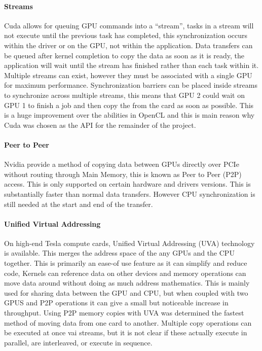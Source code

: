 \documentclass[12pt,a4paper]{article}
\begin{document}
\paragraph{Streams}
Cuda allows for queuing GPU commands into a “stream”, tasks in a stream will not execute until the previous task has completed, this synchronization occurs within the driver or on the GPU, not within the application. Data transfers can be queued after kernel completion to copy the data as soon as it is ready, the application will wait until the stream has finished rather than each task within it. Multiple streams can exist, however they must be associated with a single GPU for maximum performance. Synchronization barriers can be placed inside streams to synchronize across multiple streams, this means that GPU 2 could wait on GPU 1 to finish a job and then copy the from the card as soon as possible. This is a huge improvement over the abilities in OpenCL and this is main reason why Cuda was chosen as the API for the remainder of the project.

\paragraph{Peer to Peer}
Nvidia provide a method of copying data between GPUs directly over PCIe without routing through Main Memory, this is known as Peer to Peer (P2P) access. This is only supported on certain hardware and drivers versions. This is substantially faster than normal data transfers. However CPU synchronization is still needed at the start and end of the transfer.

\paragraph{Unified Virtual Addressing}
On high-end Tesla compute cards, Unified Virtual Addressing (UVA) technology is available.  This merges the address space of the any GPUs and the CPU together. This is primarily an ease-of use feature as it can simplify and reduce code, Kernels can reference data on other devices and memory operations can move data around without doing as much address mathematics. This is mainly used for sharing data between the GPU and CPU, but when coupled with two GPUS and P2P operations it can give a small but noticeable increase in throughput. Using P2P memory copies with UVA was determined the fastest method of moving data from one card to another. Multiple copy operations can be executed at once vai streams, but it is not clear if these actually execute in parallel, are interleaved, or execute in sequence.
\end{document}
